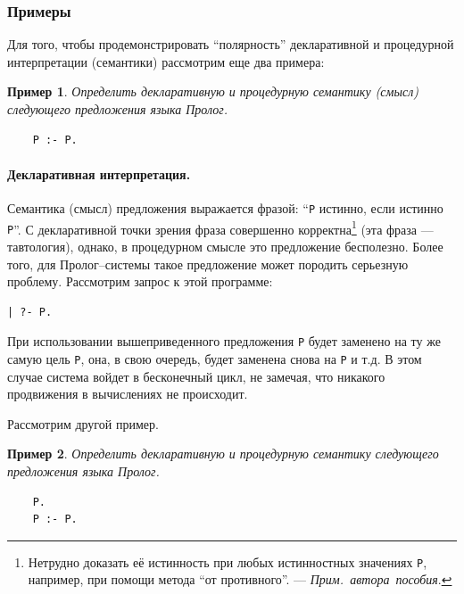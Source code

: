 \documentclass[12pt, openany, twoside]{book} %
\def\AR{{\em Прим.~автора~пособия}}
\newtheorem{example}{Пример}[chapter]
\begin{document}
\subsubsection{Примеры}
Для того, чтобы продемонстрировать ``полярность'' декларативной и процедурной интерпретации (семантики) рассмотрим еще два примера:

\begin{example}
Определить декларативную и процедурную семантику (смысл) следующего предложения языка Пролог.
\end{example}
{\tt\begin{verbatim}
    P :- P.
\end{verbatim}}

\paragraph{Декларативная интерпретация.}
\noindent Семантика (смысл) предложения выражается фразой: ``{\tt P} истинно, если истинно {\tt P}''. С декларативной точки зрения фраза совершенно корректна\footnote{Нетрудно доказать её истинность при любых истинностных значениях {\tt P}, например, при помощи метода ``от противного''. --- \AR.} (эта фраза --- тавтология),  однако, в процедурном смысле это предложение бесполезно. Более того, для Пролог--системы такое предложение может породить серьезную проблему. Рассмотрим запрос к этой программе:
{\tt\begin{verbatim}
| ?- P.
\end{verbatim}}
\noindent При использовании вышеприведенного предложения {\tt P} будет заменено на ту же самую цель {\tt P}, она, в свою очередь, будет заменена снова на {\tt P} и т.д. В этом случае система войдет в бесконечный цикл, не замечая, что никакого продвижения в вычислениях не происходит.

Рассмотрим другой пример.
\begin{example}
Определить декларативную и процедурную семантику следующего предложения языка Пролог.
\end{example}
{\tt\begin{verbatim}
    P.
    P :- P.
\end{verbatim}}
\end{document}
